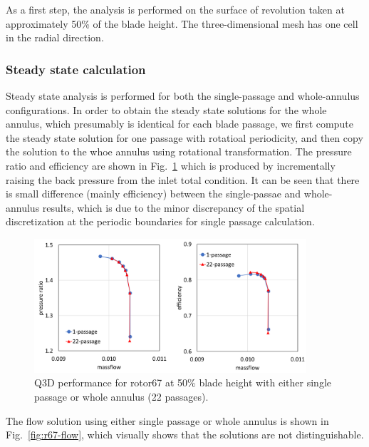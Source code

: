 \documentclass[journal,final]{new-aiaa}
\begin{document}
As a first step, the analysis is performed on the surface of
revolution taken at approximately 50\% of the blade height.
The three-dimensional mesh has one cell in the radial direction.

\subsubsection{Steady state calculation}
Steady state analysis is performed for both
the single-passage and whole-annulus
configurations. In order to obtain the steady state
solutions for the whole annulus, which presumably
is identical for each blade passage, we first compute
the steady state solution for one passage with
rotatioal periodicity, and then copy the solution
to the whoe annulus using rotational transformation.
The pressure ratio and efficiency are shown in Fig.~\ref{fig:r67-performance}
which is produced by incrementally raising the back pressure
from the inlet total condition. It can be seen that there is small
difference (mainly efficiency) between the single-passae and
whole-annulus results, which is due to the minor discrepancy
of the spatial discretization at the periodic boundaries for single
passage calculation.

\begin{figure}[htb]
	\centering   
	\includegraphics[width=0.9\textwidth]{pic/rotor67-performance.png}
	\caption{Q3D performance for rotor67 at 50\% blade height with either
		single passage or whole annulus (22 passages).}
	\label{fig:r67-performance}
\end{figure}

The flow solution using either single passage or whole annulus
is shown in Fig.~\ref{fig:r67-flow}, which visually shows that
the solutions are not distinguishable.
\end{document}
